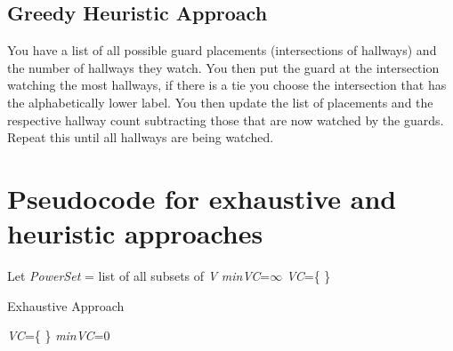 \documentclass{article}
\begin{document}
\subsection{Greedy Heuristic Approach}
You have a list of all possible guard placements (intersections of hallways) and the number of hallways they watch. You then put the guard at the intersection watching the most hallways, if there is a tie you choose the intersection that has the alphabetically lower label. You then update the list of placements and the respective hallway count subtracting those that are now watched by the guards. Repeat this until all hallways are being watched.
\newpage
\section{Pseudocode for exhaustive and heuristic approaches}
\begin{algorithm}[H]
\SetAlgoLined
{}
Let \textit{PowerSet} = list of all subsets of \textit{V}\;
\textit{minVC}=$\infty$ \;
\textit{VC}=\{ \}\;
\caption{Exhaustive Approach}
\end{algorithm}
\begin{algorithm}[H]
\textit{VC}=\{ \}\;
\textit{minVC}=0 \;
\end{algorithm}
\end{document}
